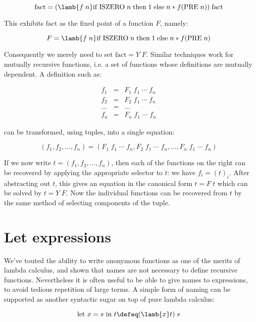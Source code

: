 $$ \mbox{fact} = (\lamb{f\; n} \mbox{if ISZERO}\; n\; \mbox{then}\; 1\;
\mbox{else}\; n * f(\mbox{PRE}\; n))\; \mbox{fact} $$

\noindent This exhibits $\mbox{fact}$ as the fixed point of a function
$F$, namely:

$$ F = \lamb{f\; n} \mbox{if ISZERO}\; n\; \mbox{then}\; 1\; \mbox{else}\; n *
f(\mbox{PRE}\; n) $$

Consequently we merely need to set $\mbox{fact} = Y\; F$. Similar techniques
work for mutually recursive functions, i.e. a set of functions whose
definitions are mutually dependent. A definition such as:

\begin{eqnarray*}
f_1 & = & F_1\; f_1\; \cdots \; f_n             \\
f_2 & = & F_2\; f_1\; \cdots \; f_n             \\
\ldots & = & \ldots                             \\
f_n & = & F_n\; f_1\; \cdots \; f_n
\end{eqnarray*}

\noindent can be transformed, using tuples, into a single equation:

$$ (f_1,f_2,\ldots,f_n) = (F_1\; f_1\; \cdots \; f_n,
                           F_2\; f_1\; \cdots \; f_n,
                           \ldots,
                           F_n\; f_1\; \cdots \; f_n) $$

If we now write $t = (f_1,f_2,\ldots,f_n)$, then each of the functions on the
right can be recovered by applying the appropriate selector to $t$: we have
$f_i = (t)_i$. After abstracting out $t$, this gives an equation in the
canonical form $t = F\; t$ which can be solved by $t = Y\; F$. Now the
individual functions can be recovered from $t$ by the same method of selecting
components of the tuple.

\section{Let expressions}

We've touted the ability to write anonymous functions as one of the merits of
lambda calculus, and shown that names are not necessary to define recursive
functions. Nevertheless it is often useful to be able to give names to
expressions, to avoid tedious repetition of large terms. A simple form of
naming can be supported as another syntactic sugar on top of pure lambda
calculus:

$$ \mbox{let } x = s \mbox{ in } t \defeq (\lamb{x} t)\; s $$

